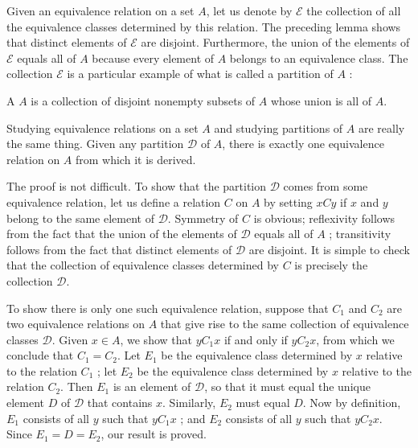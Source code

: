 Given an equivalence relation on a set \(A\), let us denote by \(\mathcal{E}\) the collection of all the equivalence classes determined by this relation. The preceding lemma shows that distinct elements of \(\mathcal{E}\) are disjoint. Furthermore, the union of the elements of \(\mathcal{E}\) equals all of \(A\) because every element of \(A\) belongs to an equivalence class. The collection \(\mathcal{E}\) is a particular example of what is called a partition of \(A\) :

\begin{definition}
 A  \(A\) is a collection of disjoint nonempty subsets of \(A\) whose union is all of \(A\).
\end{definition}

Studying equivalence relations on a set \(A\) and studying partitions of \(A\) 
are really the same thing. Given any partition \(\mathcal{D}\) of \(A\), 
there is exactly one equivalence relation on \(A\) from which it is derived.

The proof is not difficult. To show that the partition \(\mathcal{D}\) 
comes from some equivalence relation, let us define a relation \(C\) on \(A\) 
by setting \({xCy}\) if \(x\) and \(y\) belong to the same element of \(\mathcal{D}\). 
Symmetry of \(C\) is obvious; reflexivity follows from the fact that the union of 
the elements of \(\mathcal{D}\) equals all of \(A\) ; transitivity follows 
from the fact that distinct elements of \(\mathcal{D}\) are disjoint. 
It is simple to check that the collection of equivalence classes determined 
by \(C\) is precisely the collection \(\mathcal{D}\).

To show there is only one such equivalence relation, suppose that 
\(C_{1}\) and \(C_{2}\) are two equivalence relations on \(A\) 
that give rise to the same collection of equivalence classes \(\mathcal{D}\). 
Given \(x \in A\), we show that \(yC_{1}x\) if and only if \(yC_{2}x\), 
from which we conclude that \(C_{1} = C_{2}\). Let \(E_{1}\) 
be the equivalence class determined by \(x\) relative to the relation 
\(C_{1}\) ; let \(E_{2}\) be the equivalence class determined by \(x\) 
relative to the relation \(C_{2}\). Then \(E_{1}\) is an element of \(\mathcal{D}\), 
so that it must equal the unique element \(D\) of \(\mathcal{D}\) that contains \(x\). 
Similarly, \(E_{2}\) must equal \(D\). Now by definition, \(E_{1}\) consists of 
all \(y\) such that \(yC_{1}x\) ; and \(E_{2}\) consists of all \(y\) 
such that \(yC_{2}x\). Since \(E_{1} = D = E_{2}\), our result is proved.

